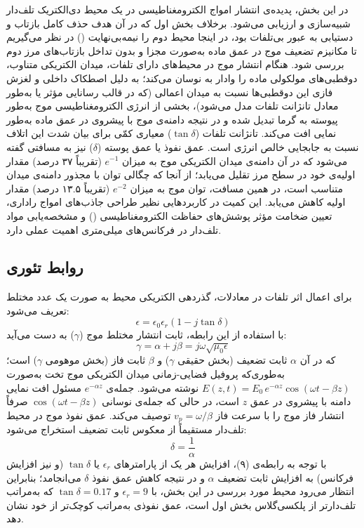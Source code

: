 \documentclass{article}
\begin{document}
	در این بخش، پدیده‌ی انتشار امواج الکترومغناطیسی در یک محیط دی‌الکتریک تلف‌دار شبیه‌سازی و ارزیابی می‌شود. برخلاف بخش اول که در آن هدف حذف کامل بازتاب و دستیابی به عبور بی‌تلفات بود، در اینجا محیط دوم را نیمه‌بی‌نهایت () در نظر می‌گیریم تا مکانیزم تضعیف موج در عمق ماده به‌صورت مجزا و بدون تداخل بازتاب‌های مرز دوم بررسی شود. هنگام انتشار موج در محیط‌های دارای تلفات، میدان الکتریکی متناوب، دوقطبی‌های مولکولی ماده را وادار به نوسان می‌کند؛ به دلیل اصطکاک داخلی و لغزش فازی این دوقطبی‌ها نسبت به میدان اعمالی (که در قالب رسانایی مؤثر یا به‌طور معادل تانژانت تلفات مدل می‌شود)، بخشی از انرژی الکترومغناطیسی موج به‌طور پیوسته به گرما تبدیل شده و در نتیجه دامنه‌ی موج با پیشروی در عمق ماده به‌طور نمایی افت می‌کند. تانژانت تلفات ($\tan\delta$) معیاری کمّی برای بیان شدت این اتلاف نسبت به جابجایی خالص انرژی است. عمق نفوذ یا عمق پوسته ($\delta$) نیز به مسافتی گفته می‌شود که در آن دامنه‌ی میدان الکتریکی موج به میزان $e^{-1}$ (تقریباً ۳۷ درصد) مقدار اولیه‌ی خود در سطح مرز تقلیل می‌یابد؛ از آنجا که چگالی توان با مجذور دامنه‌ی میدان متناسب است، در همین مسافت، توان موج به میزان $e^{-2}$ (تقریباً ۱۳.۵ درصد) مقدار اولیه کاهش می‌یابد. این کمیت در کاربردهایی نظیر طراحی جاذب‌های امواج راداری، تعیین ضخامت مؤثر پوشش‌های حفاظت الکترومغناطیسی () و مشخصه‌یابی مواد تلف‌دار در فرکانس‌های میلی‌متری اهمیت عملی دارد.
	
	\subsection{روابط تئوری}
	برای اعمال اثر تلفات در معادلات، گذردهی الکتریکی محیط به صورت یک عدد مختلط تعریف می‌شود:
	\begin{equation}
		\epsilon = \epsilon_0 \epsilon_r (1 - j\tan\delta)
	\end{equation}
	با استفاده از این رابطه، ثابت انتشار مختلط موج ($\gamma$) به دست می‌آید:
	\begin{equation}
		\gamma = \alpha + j\beta = j\omega\sqrt{\mu_0\epsilon}
	\end{equation}
	که در آن $\alpha$ ثابت تضعیف (بخش حقیقی $\gamma$) و $\beta$ ثابت فاز (بخش موهومی $\gamma$) است؛ به‌طوری‌که پروفیل فضایی-زمانی میدان الکتریکی موج تخت به‌صورت $E(z,t) = E_0\, e^{-\alpha z}\cos(\omega t - \beta z)$ نوشته می‌شود. جمله‌ی $e^{-\alpha z}$ مسئول افت نمایی دامنه با پیشروی در عمق $z$ است، در حالی که جمله‌ی نوسانی $\cos(\omega t - \beta z)$ صرفاً انتشار فاز موج را با سرعت فاز $v_p=\omega/\beta$ توصیف می‌کند. عمق نفوذ موج در محیط تلف‌دار مستقیماً از معکوس ثابت تضعیف استخراج می‌شود:
	\begin{equation}
		\delta = \frac{1}{\alpha}
	\end{equation}
	با توجه به رابطه‌ی (۹)، افزایش هر یک از پارامترهای $\epsilon_r$ یا $\tan\delta$ (و نیز افزایش فرکانس) به افزایش ثابت تضعیف $\alpha$ و در نتیجه کاهش عمق نفوذ $\delta$ می‌انجامد؛ بنابراین انتظار می‌رود محیط مورد بررسی در این بخش، با $\epsilon_r=9$ و $\tan\delta=0.17$ که به‌مراتب تلف‌دارتر از پلکسی‌گلاس بخش اول است، عمق نفوذی به‌مراتب کوچک‌تر از خود نشان دهد.
	
\end{document}
